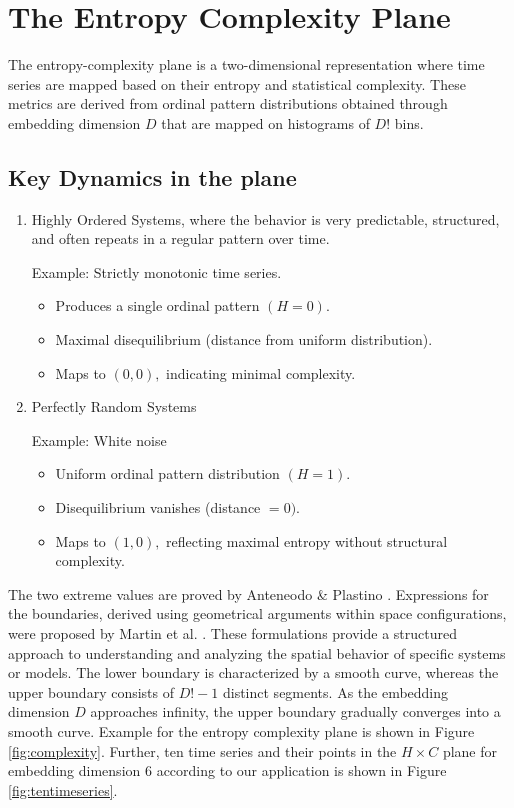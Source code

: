 \section{The Entropy Complexity Plane} \label{Sec:EntropyComplexity}
The entropy-complexity plane is a two-dimensional representation where time series are mapped based on their entropy and statistical complexity. These metrics are derived from ordinal pattern distributions obtained through embedding dimension $D$ that are mapped on histograms of $D!$ bins. 

\subsection{Key Dynamics in the plane}
\begin{enumerate}
	\item Highly Ordered Systems, where the behavior is very predictable, structured, and often repeats in a regular pattern over time.
	
	Example: Strictly monotonic time series.
	\begin{itemize}
		\item Produces a single ordinal pattern $(H=0)$.
		
		\item Maximal disequilibrium (distance from uniform distribution).
		
		\item Maps to $(0,0),$ indicating minimal complexity.
	\end{itemize}
	
	\item Perfectly Random Systems
	
	Example: White noise
	\begin{itemize}
		\item Uniform ordinal pattern distribution $(H=1)$.
		\item Disequilibrium vanishes (distance $=0)$.
		\item Maps to $(1,0),$ reflecting maximal entropy without structural complexity.
	\end{itemize}
\end{enumerate}
The two extreme values are proved by Anteneodo \& Plastino \cite{anteneodo1996some}.
Expressions for the boundaries, derived using geometrical arguments within space configurations, were proposed by Martin et al. \cite{Martin2006}. 
These formulations provide a structured approach to understanding and analyzing the spatial behavior of specific systems or models. The lower boundary is characterized by a smooth curve, whereas the upper boundary consists of $D!-1$ distinct segments. As the embedding dimension $D$ approaches infinity, the upper boundary gradually converges into a smooth curve. 
Example for the entropy complexity plane is shown in Figure \ref{fig:complexity}. Further, ten time series and their points in the $H \times C$ plane for embedding dimension 6 according to our application is shown in Figure \ref{fig:tentimeseries}.


